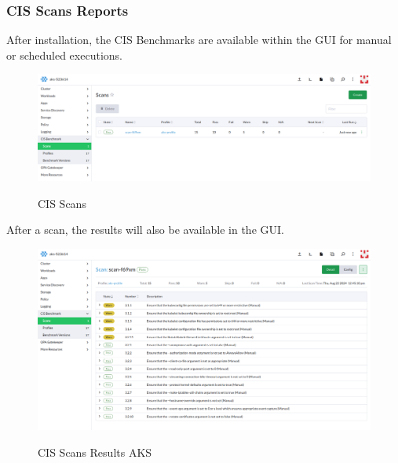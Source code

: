 \subsubsection{CIS Scans Reports}

After installation, the CIS Benchmarks are available within the GUI for manual or scheduled executions.

\begin{figure}[H]
\centering
\caption {CIS Scans}
\includegraphics[width=\linewidth]{images/cis-scans-1.png}
\label{fig:cisScans}
\end{figure}

After a scan, the results will also be available in the GUI.

\begin{figure}[H]
\centering
\caption {CIS Scans Results AKS}
\includegraphics[width=\linewidth]{images/cis-scans-2.png}
\label{fig:cisAKS}
\end{figure}
